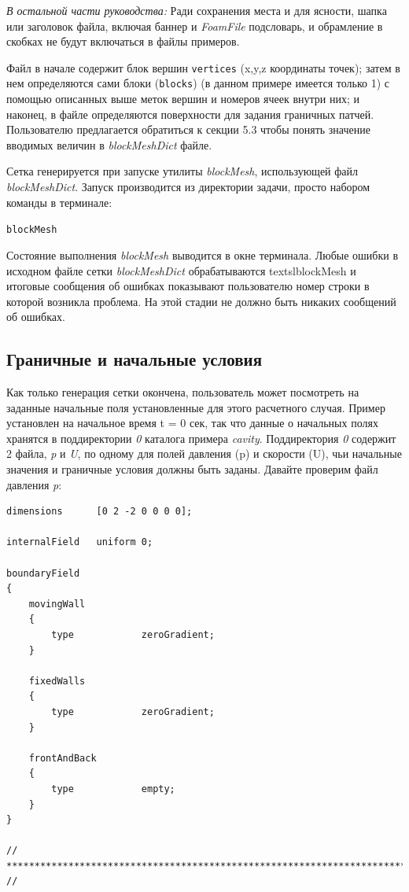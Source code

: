 \textit{В остальной части руководства:}
Ради сохранения места и для ясности, шапка или заголовок файла, включая баннер и \textsl{FoamFile} подсловарь,
 и обрамление в скобках не будут включаться в файлы примеров.

Файл в начале содержит блок вершин \texttt{vertices} (x,y,z координаты точек); затем в нем определяются сами блоки
 (\texttt{blocks})  (в данном примере имеется только 1) с помощью описанных выше меток вершин и номеров
 ячеек внутри них; и наконец, в файле определяются поверхности для задания граничных патчей.
 Пользователю предлагается обратиться к секции 5.3 чтобы понять значение вводимых  величин в \textsl{blockMeshDict} файле.

Сетка генерируется при запуске утилиты \textsl{blockMesh}, использующей файл \textsl{blockMeshDict}.
Запуск производится из директории задачи, просто набором команды в терминале:

\texttt{blockMesh}

Состояние выполнения \textsl{blockMesh} выводится в окне терминала. Любые ошибки в исходном 
файле сетки \textsl{blockMeshDict} обрабатываются textsl{blockMesh} и итоговые сообщения об ошибках показывают 
пользователю номер строки в которой возникла проблема. На этой стадии не должно быть никаких сообщений об ошибках.

\subsection{Граничные и начальные условия}
\label{sec:2.1.1.2}

Как только генерация сетки окончена, пользователь может посмотреть на заданные начальные поля установленные для этого
 расчетного случая. Пример установлен на начальное время t = 0 сек, так что данные о начальных полях
 хранятся в поддиректории \textit{0} каталога примера \textit{cavity}. Поддиректория \textit{0} содержит
 2 файла, \textit{p} и \textit{U}, по одному для полей давления (p) и скорости (U),
 чьи начальные значения и граничные условия должны быть заданы. Давайте проверим файл давления \textit{p}:

\begin{verbatim}
dimensions      [0 2 -2 0 0 0 0];

internalField   uniform 0;

boundaryField
{
    movingWall      
    {
        type            zeroGradient;
    }

    fixedWalls      
    {
        type            zeroGradient;
    }

    frontAndBack    
    {
        type            empty;
    }
}

// ************************************************************************* // 
\end{verbatim} 

